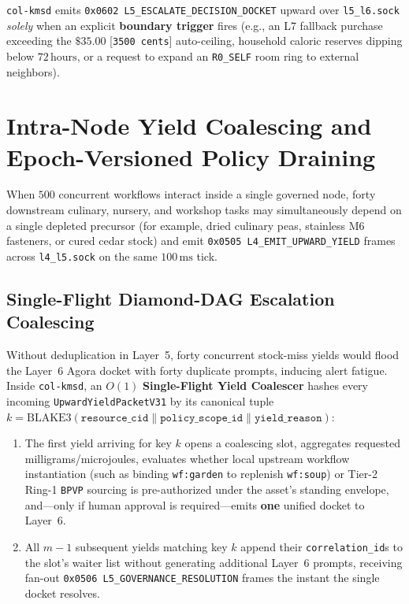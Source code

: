 \texttt{col-kmsd} emits \texttt{0x0602 L5\_ESCALATE\_DECISION\_DOCKET} upward over
\texttt{l5\_l6.sock} \textit{solely} when an explicit \textbf{boundary trigger} fires (e.g., an L7
fallback purchase exceeding the $\$35.00$ [\texttt{3500 cents}] auto-ceiling, household caloric
reserves dipping below $72\,\mathrm{hours}$, or a request to expand an \texttt{R0\_SELF} room
ring to external neighbors).

\section{Intra-Node Yield Coalescing and Epoch-Versioned Policy Draining}
\label{sec:ch4-yield-coalescing}

When $500$ concurrent workflows interact inside a single governed node, forty downstream culinary,
nursery, and workshop tasks may simultaneously depend on a single depleted precursor (for
example, dried culinary peas, stainless M6 fasteners, or cured cedar stock) and emit
\texttt{0x0505 L4\_EMIT\_UPWARD\_YIELD} frames across \texttt{l4\_l5.sock} on the same
$100\,\mathrm{ms}$ tick.

\subsection{Single-Flight Diamond-DAG Escalation Coalescing}

Without deduplication in Layer~5, forty concurrent stock-miss yields would flood the Layer~6
Agora docket with forty duplicate prompts, inducing alert fatigue. Inside \texttt{col-kmsd}, an
$O(1)$ \textbf{Single-Flight Yield Coalescer} hashes every incoming \texttt{UpwardYieldPacketV31} by
its canonical tuple $k = \mathrm{BLAKE3}(\mathtt{resource\_cid} \parallel
\mathtt{policy\_scope\_id} \parallel \mathtt{yield\_reason})$:
\begin{enumerate}
\item The first yield arriving for key $k$ opens a coalescing slot, aggregates requested
        milligrams/microjoules, evaluates whether local upstream workflow instantiation (such as
        binding \texttt{wf:garden} to replenish \texttt{wf:soup}) or Tier-2 Ring-1
        \texttt{BPVP} sourcing is pre-authorized under the asset's standing envelope, and---only
        if human approval is required---emits \textbf{one} unified docket to Layer~6.
\item All $m - 1$ subsequent yields matching key $k$ append their \texttt{correlation\_id}s to
        the slot's waiter list without generating additional Layer~6 prompts, receiving fan-out
        \texttt{0x0506 L5\_GOVERNANCE\_RESOLUTION} frames the instant the single docket resolves.
\end{enumerate}

